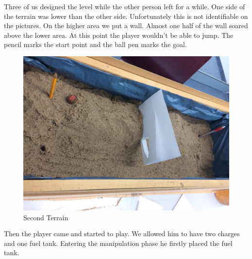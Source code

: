 \documentclass[12pt, letterpaper]{scrartcl}
\begin{document}
	Three of us designed the level while the other person left for a while. One side of the terrain was lower than the other side. Unfortunately this is not identifiable on the pictures. On the higher area we put a wall. Almost one half of the wall soared above the lower area. At this point the player wouldn't be able to jump. The pencil marks the start point and the ball pen marks the goal. 
	\begin{figure}[H]
		\centering
		\includegraphics[scale=.2]{images/prototype/prototypeTerrain2}
		\caption{Second Terrain}
	\end{figure}
	Then the player came and started to play. We allowed him to have two charges and one fuel tank. 
	Entering the manipulation phase he firstly placed the fuel tank.
\end{document}
